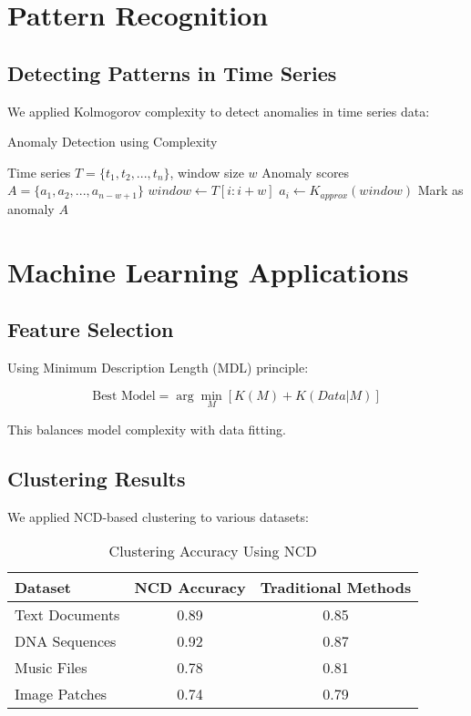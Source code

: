\documentclass[12pt,a4paper]{report}
\begin{document}
\section{Pattern Recognition}

\subsection{Detecting Patterns in Time Series}

We applied Kolmogorov complexity to detect anomalies in time series data:

\begin{algorithm}
\caption{Anomaly Detection using Complexity}
\begin{algorithmic}[1]
\REQUIRE Time series $T = \{t_1, t_2, ..., t_n\}$, window size $w$
\ENSURE Anomaly scores $A = \{a_1, a_2, ..., a_{n-w+1}\}$
    \STATE $window \leftarrow T[i:i+w]$
    \STATE $a_i \leftarrow K_{approx}(window)$
        \STATE Mark as anomaly
    \ENDIF
\ENDFOR
\RETURN $A$
\end{algorithmic}
\end{algorithm}

\section{Machine Learning Applications}

\subsection{Feature Selection}

Using Minimum Description Length (MDL) principle:

\begin{equation}
\text{Best Model} = \arg\min_{M} [K(M) + K(Data|M)]
\end{equation}

This balances model complexity with data fitting.

\subsection{Clustering Results}

We applied NCD-based clustering to various datasets:

\begin{table}[h]
\centering
\caption{Clustering Accuracy Using NCD}
\begin{tabular}{lcc}
\toprule
\textbf{Dataset} & \textbf{NCD Accuracy} & \textbf{Traditional Methods} \\
\midrule
Text Documents & 0.89 & 0.85 \\
DNA Sequences & 0.92 & 0.87 \\
Music Files & 0.78 & 0.81 \\
Image Patches & 0.74 & 0.79 \\
\bottomrule
\end{tabular}
\end{table}
\end{document}
